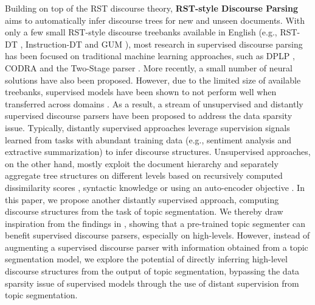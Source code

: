 \documentclass[letterpaper]{article} %
\begin{document}
Building on top of the RST discourse theory, \textbf{RST-style Discourse Parsing} aims to automatically infer discourse trees for new and unseen documents. 
With only a few small RST-style discourse treebanks available in English (e.g., RST-DT \cite{carlson2002rst}, Instruction-DT \cite{subba-di-eugenio-2009-effective} and GUM \cite{Zeldes2017}), most research in supervised discourse parsing has been focused on traditional machine learning approaches, such as DPLP \cite{ji-eisenstein-2014-representation}, CODRA \cite{joty-etal-2015-codra} and the Two-Stage parser \cite{wang-etal-2017-two}. More recently, a small number of neural solutions \cite{yu-etal-2018-transition, kobayashi2020top, guz-carenini-2020-coreference, guz-carenini-2020-towards} have also been proposed. However, due to the limited size of available treebanks, supervised models have been shown to not perform well when transferred across domains \cite{huber-carenini-2020-mega}.
As a result, a stream of unsupervised \cite{kobayashi-etal-2019-split, nishida-nakayama-2020-unsupervised, huber2021unsupervised} and distantly supervised \cite{huber-carenini-2019-predicting, huber-carenini-2020-mega, xiao2021predicting} discourse parsers have been proposed to address the data sparsity issue. Typically, distantly supervised approaches leverage supervision signals learned from tasks with abundant training data (e.g., sentiment analysis and extractive summarization) to infer discourse structures. Unsupervised approaches, on the other hand, mostly exploit the document hierarchy and separately aggregate tree structures on different levels based on recursively computed dissimilarity scores \cite{kobayashi-etal-2019-split}, syntactic knowledge \cite{nishida-nakayama-2020-unsupervised} or using an auto-encoder objective \cite{huber2021unsupervised}. In this paper, we propose another distantly supervised approach, computing discourse structures from the task of topic segmentation. 
We thereby draw inspiration from the findings in \citet{jiang2021hierarchical}, showing that a pre-trained topic segmenter can benefit supervised discourse parsers, especially on high-levels. However, instead of augmenting a supervised discourse parser with information obtained from a topic segmentation model, we explore the potential of directly inferring high-level discourse structures from the output of topic segmentation, bypassing the data sparsity issue of supervised 
models through the use of distant supervision from topic segmentation.
\end{document}
